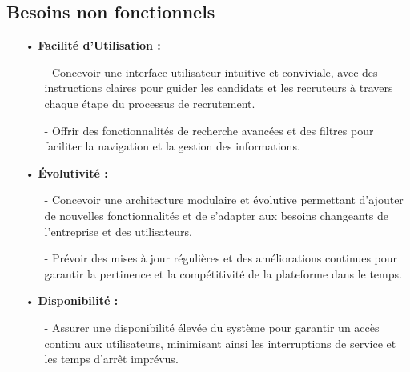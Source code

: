 \subsection{Besoins non fonctionnels}


\begin{itemize}
    \setlength{\itemsep}{0.3cm}
    \item[•] \textbf{Facilité d'Utilisation :}
    \begin{itemize}
        \setlength{\itemsep}{0.2cm}
        \item[-] Concevoir une interface utilisateur intuitive et conviviale, avec des instructions claires pour guider les candidats et les recruteurs à travers chaque étape du processus de recrutement.
        \item[-] Offrir des fonctionnalités de recherche avancées et des filtres pour faciliter la navigation et la gestion des informations.
    \end{itemize}
    \item[•] \textbf{Évolutivité :}
    \begin{itemize}
        \setlength{\itemsep}{0.2cm}
        \item[-] Concevoir une architecture modulaire et évolutive permettant d'ajouter de nouvelles fonctionnalités et de s'adapter aux besoins changeants de l'entreprise et des utilisateurs.
        \item[-] Prévoir des mises à jour régulières et des améliorations continues pour garantir la pertinence et la compétitivité de la plateforme dans le temps.
    \end{itemize}
    \item[•] \textbf{Disponibilité :}
    \begin{itemize}
        \setlength{\itemsep}{0.2cm}
        \item[-] Assurer une disponibilité élevée du système pour garantir un accès continu aux utilisateurs, minimisant ainsi les interruptions de service et les temps d'arrêt imprévus.
    \end{itemize}

\end{itemize}
